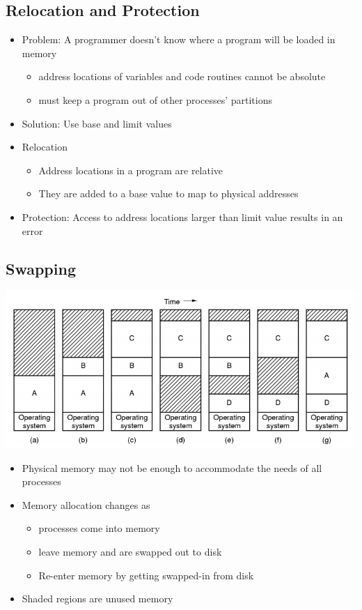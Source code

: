\documentclass[12pt]{article}
\begin{document}
\subsection{Relocation and Protection}
\begin{itemize}
    \item Problem: A programmer doesn’t know where a program will be loaded in memory \begin{itemize}
        \item address locations of variables and code routines cannot be absolute
        \item must keep a program out of other processes’ partitions
    \end{itemize}
    \item Solution: Use base and limit values
    \item Relocation \begin{itemize}
        \item Address locations in a program are relative
        \item They are added to a base value to map to physical addresses
    \end{itemize}
    \item Protection: Access to address locations larger than limit value results in an error
\end{itemize}
\subsection{Swapping}
\includegraphics[width=\textwidth]{Swapping.png}
\begin{itemize}
    \item Physical memory may not be enough to accommodate the needs of all processes
    \item Memory allocation changes as \begin{itemize}
        \item processes come into memory
        \item leave memory and are swapped out to disk
        \item Re-enter memory by getting swapped-in from disk
    \end{itemize}
    \item Shaded regions are unused memory
\end{itemize}
\end{document}
